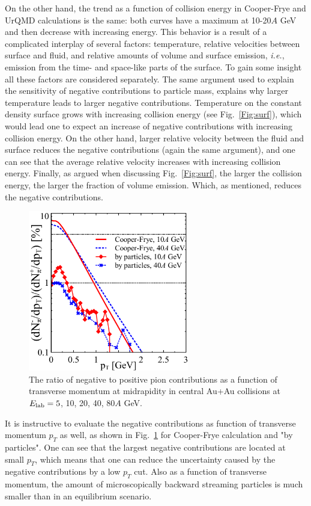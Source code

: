 On the other hand, the trend as a function of collision energy in
Cooper-Frye and UrQMD calculations is the same: both curves have a
maximum at 10-20$A$ GeV and then decrease with increasing energy. This
behavior is a result of a complicated interplay of several factors:
temperature, relative velocities between surface and fluid, and
relative amounts of volume and surface emission, \emph{i.e.}, emission
from the time- and space-like parts of the surface. To gain some
insight all these factors are considered separately. The same argument
used to explain the sensitivity of negative contributions to particle
mass, explains why larger temperature leads to larger negative
contributions. Temperature on the constant density surface grows with
increasing collision energy (see Fig.~\ref{Fig:surf}), which would
lead one to expect an increase of negative contributions with
increasing collision energy. On the other hand, larger relative
velocity between the fluid and surface reduces the negative
contributions (again the same argument), and one can see that the average
relative velocity increases with increasing collision energy. Finally,
as argued when discussing Fig.~\ref{Fig:surf}, the
larger the collision energy, the larger the fraction of volume
emission. Which, as mentioned, reduces the negative contributions.

\begin{figure}[htp]
\includegraphics[width=7cm]{plots/cooper_frye/pt_binned_negcontr_pi_E40rebinned.pdf}
\caption{ The ratio of negative to positive pion
  contributions as a function of transverse momentum at midrapidity in
  central Au+Au collisions at $E_\mathrm{lab} = 5$, 10, 20, 40, 80$A$ GeV.}
\label{Fig:neg_contr_pt}
\end{figure}

It is instructive to evaluate the negative contributions as function
of transverse momentum $p_T$ as well, as shown in
Fig.~\ref{Fig:neg_contr_pt} for Cooper-Frye calculation and "by
particles". One can see that the largest negative contributions are
located at small $p_T$, which means that one can reduce the
uncertainty caused by the negative contributions by a low $p_T$
cut. Also as a function of transverse momentum, the amount of
microscopically backward streaming particles is much smaller than in
an equilibrium scenario.

